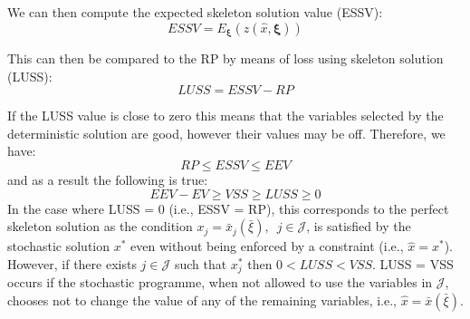 \documentclass[../thesis.tex]{subfiles}
\begin{document}
We can then compute the expected skeleton solution value (ESSV):
\vspace{-.1cm}
\begin{equation}\label{eq:ESSV}
    ESSV = E_{\boldsymbol{\xi}}(z(\hat x, \boldsymbol{\xi}))
\end{equation}

This can then be compared to the RP by means of loss using skeleton solution (LUSS):
\vspace{-0.1cm}
\begin{equation}\label{eq:LUSS}
    LUSS = ESSV - RP
\end{equation}

If the LUSS value is close to zero this means that the variables selected by the deterministic solution are good, however their values may be off. Therefore, we have:
\begin{equation}
    RP \leq ESSV \leq EEV
\end{equation}
and as a result the following is true:
\begin{equation}
    EEV - EV \geq VSS \geq LUSS \geq 0
\end{equation}
In the case where LUSS = 0 (i.e., ESSV = RP), this corresponds to the perfect skeleton solution as the condition $x_{j} = \bar x_{j} (\bar \xi), \enspace j \in \mathcal{J}$, is satisfied by the stochastic solution $x^{*}$ even without being enforced by a constraint (i.e., $\hat x = x^{*}$). However, if there exists $j \in \mathcal{J}$ such that $x^{*}_{j}$ then $0 < LUSS < VSS$. LUSS = VSS occurs if the stochastic programme, when not allowed to use the variables in $\mathcal{J}$, chooses not to change the value of any of the remaining variables, i.e., $\hat x = \bar x (\bar \xi)$.
\end{document}
